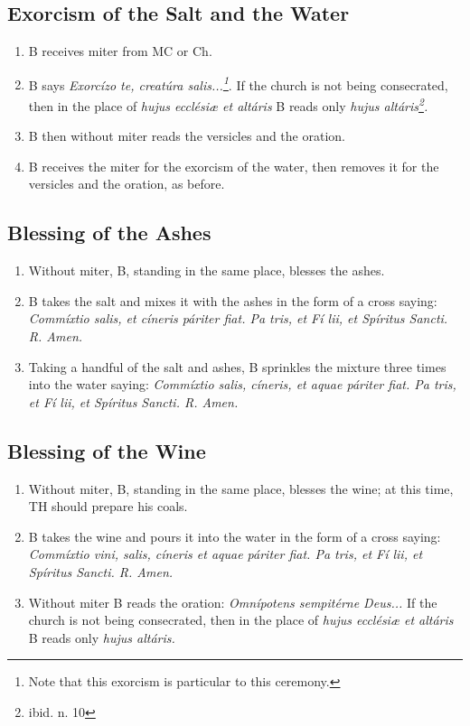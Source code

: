\documentclass[letterpaper, twocolumn]{article}
\begin{document}
\subsection*{Exorcism of the Salt and the Water}
\begin{enumerate}
	\item B receives miter from MC or Ch.
	\item B says \textit{Exorcízo te, creatúra salis...\footnote{Note that this exorcism is particular to this ceremony.}}. If the church is not being consecrated, then in the place of \textit{hujus ecclésiæ et altáris} B reads only \textit{hujus altáris\footnote{ibid. n. 10}.}
	\item B then without miter reads the versicles and the oration.
	\item B receives the miter for the exorcism of the water, then removes it for the versicles and the oration, as before.
\end{enumerate}
\subsection*{Blessing of the Ashes}
\begin{enumerate}
	\item Without miter, B, standing in the same place, blesses the ashes.
	\item B takes the salt and mixes it with the ashes in the form of a cross saying: \textit{Commíxtio salis, et cíneris páriter fiat. Pa  tris, et Fí  lii, et Spíritus  Sancti. R. Amen.}
	\item Taking a handful of the salt and ashes, B sprinkles the mixture three times into the water saying: \textit{Commíxtio salis, cíneris, et aquae páriter fiat. Pa  tris, et Fí  lii, et Spíritus  Sancti. R. Amen.}
\end{enumerate}
\subsection*{Blessing of the Wine}
\begin{enumerate}
	\item Without miter, B, standing in the same place, blesses the wine; at this time, TH should prepare his coals.
	\item B takes the wine and pours it into the water in the form of a cross saying: \textit{Commíxtio vini, salis, cíneris et aquae páriter fiat. Pa  tris, et Fí  lii, et Spíritus  Sancti. R. Amen.}
	\item Without miter B reads the oration: \textit{Omnípotens sempitérne Deus...} If the church is not being consecrated, then in the place of \textit{hujus ecclésiæ et altáris} B reads only \textit{hujus altáris.}
\end{enumerate}
\end{document}
